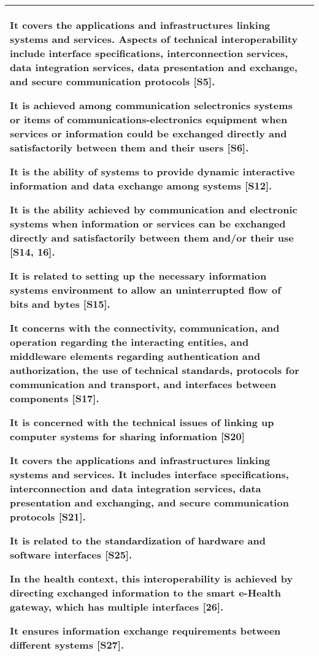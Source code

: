 \begin{longtable}{|p{2.3cm}|p{14cm}|}
    It covers the applications and infrastructures linking systems and services. Aspects of technical interoperability include interface specifications, interconnection services, data integration services, data presentation and exchange, and secure communication protocols [S5].
    
    It is achieved among communication selectronics systems or items of communications-electronics equipment when services or information could be exchanged directly and satisfactorily between them and their users [S6].
    
    It is the ability of systems to provide dynamic interactive information and data exchange among systems [S12].
    
    It is the ability achieved by communication and electronic systems when information or services can be exchanged directly and satisfactorily between them and/or their use [S14, 16].

    It is related to setting up the necessary information systems environment to allow an uninterrupted flow of bits and bytes [S15].
    
    It concerns with the connectivity, communication, and operation regarding the interacting entities, and middleware elements regarding authentication and authorization, the use of technical standards, protocols for communication and transport, and interfaces between components [S17]. 
    
    It is concerned with the technical issues of linking up computer systems for sharing information [S20]

    It covers the applications and infrastructures linking systems and services. It includes interface specifications, interconnection and data integration services, data presentation and exchanging, and secure communication protocols [S21].

    
    It is related to the standardization of hardware and software interfaces [S25]. 
    
    In the health context, this interoperability is achieved by directing exchanged information to the smart e-Health gateway, which has multiple interfaces [26].
    
    It ensures information exchange requirements between different systems [S27].
    \\\hline

\end{longtable}
\normalsize

